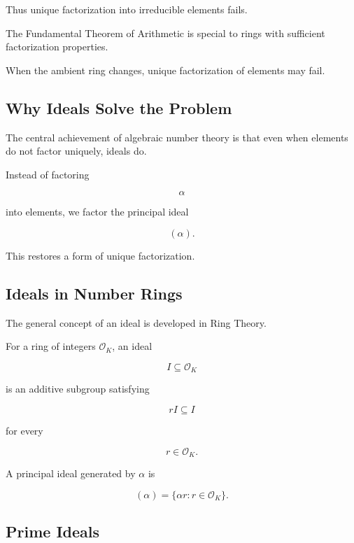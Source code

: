 Thus unique factorization into irreducible elements fails.

\begin{warningbox}
The Fundamental Theorem of Arithmetic is special to rings with sufficient
factorization properties.

When the ambient ring changes, unique factorization of elements may fail.
\end{warningbox}

\subsection{Why Ideals Solve the Problem}
\label{subsec:why-ideals-solve-factorization}

The central achievement of algebraic number theory is that even when
elements do not factor uniquely, ideals do.

Instead of factoring

\[ \alpha \]

into elements, we factor the principal ideal

\[ (\alpha). \]

This restores a form of unique factorization.

\subsection{Ideals in Number Rings}
\label{subsec:ideals-number-rings}

The general concept of an ideal is developed in Ring Theory.

For a ring of integers \(\mathcal O_K\), an ideal

\[ I\subseteq\mathcal O_K \]

is an additive subgroup satisfying

\[ rI\subseteq I \]

for every

\[ r\in\mathcal O_K. \]

A principal ideal generated by \(\alpha\) is

\[ (\alpha)=\{\alpha r:r\in\mathcal O_K\}. \]

\subsection{Prime Ideals}
\label{subsec:prime-ideals-number-theory}

